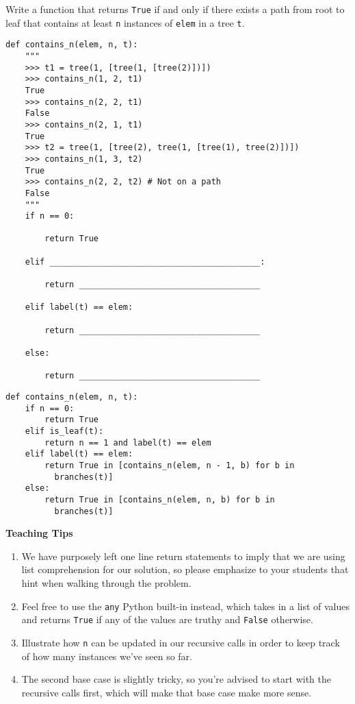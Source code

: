 \begin{blocksection}
\question {} Write a function that returns \lstinline{True} if and only if there exists a path from root to leaf that contains at least \lstinline{n} instances of \lstinline{elem} in a tree \lstinline{t}.

\begin{lstlisting}
def contains_n(elem, n, t):
    """
    >>> t1 = tree(1, [tree(1, [tree(2)])])
    >>> contains_n(1, 2, t1)
    True
    >>> contains_n(2, 2, t1)
    False
    >>> contains_n(2, 1, t1)
    True
    >>> t2 = tree(1, [tree(2), tree(1, [tree(1), tree(2)])])
    >>> contains_n(1, 3, t2)
    True
    >>> contains_n(2, 2, t2) # Not on a path
    False
    """
    if n == 0:

        return True

    elif ___________________________________________:

        return _____________________________________

    elif label(t) == elem:

        return _____________________________________

    else:

        return _____________________________________
\end{lstlisting}
\end{blocksection}

\begin{blocksection}
\begin{solution}
\begin{lstlisting}
def contains_n(elem, n, t):
    if n == 0:
        return True
    elif is_leaf(t):
        return n == 1 and label(t) == elem
    elif label(t) == elem:
        return True in [contains_n(elem, n - 1, b) for b in     
          branches(t)]
    else:
        return True in [contains_n(elem, n, b) for b in 
          branches(t)]
\end{lstlisting}
\end{solution}
\end{blocksection}

\begin{questionmeta}
    \textbf{Teaching Tips}
    \begin{enumerate}
            \item We have purposely left one line return statements to imply that we are using list comprehension for our solution, so please emphasize to your students that hint when walking through the problem.
            \item Feel free to use the \texttt{any} Python built-in instead, which takes in a list of values and returns \texttt{True} if any of the values are truthy and \texttt{False} otherwise.
            \item Illustrate how \texttt{n} can be updated in our recursive calls in order to keep track of how many instances we've seen so far.
            \item The second base case is slightly tricky, so you're advised to start with the recursive calls first, which will make that base case make more sense.
    \end{enumerate}
\end{questionmeta}